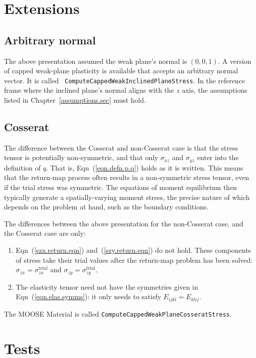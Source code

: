 \documentclass[]{scrreprt}
\begin{document}
\chapter{Extensions}

\section{Arbitrary normal}

The above presentation assumed the weak plane's normal is $(0, 0, 1)$.
A version of capped weak-plane plasticity is available that accepts an
arbitrary normal vector.  It is called {\tt
  ComputeCappedWeakInclinedPlaneStress}.  In the reference frame where
the inclined plane's normal aligns with the $z$ axis, the assumptions
listed in Chapter~\ref{assumptions.sec} must hold.

\section{Cosserat}
\label{cosserat.sec}

The difference between the Cosserat and non-Cosserat case is that the
stress tensor is potentially non-symmetric, and that only
$\sigma_{xz}$ and $\sigma_{yz}$ enter into the definition of $q$.
That is, Eqn~(\ref{eqn.defn.p.q}) holds as it is written.  This means
that the return-map process often results in a non-symmetric stress
tensor, even if the trial stress was symmetric.  The equations of
moment equilibrium then typically generate a spatially-varying moment
stress, the precise nature of which depends on the problem at hand,
such as the boundary conditions.

The differences between the above presentation for the non-Cosserat
case, and the Cosserat case are only:
\begin{enumerate}
\item Eqn~(\ref{szx.return.eqn}) and~(\ref{szy.return.eqn}) do not
  hold.  These components of stress take their trial values after the
  return-map problem has been solved: $\sigma_{zx} =
  \sigma_{zx}^{\mathrm{trial}}$ and $\sigma_{zy} =
  \sigma_{zy}^{\mathrm{trial}}$.
\item The elasticity tensor need not have the symmetries given in
  Eqn~(\ref{eqn.elas.symms}): it only needs to satisfy
  $E_{ijkl}=E_{klij}$.
\end{enumerate}
The MOOSE Material is called {\tt ComputeCappedWeakPlaneCosseratStress}.




\chapter{Tests}
\end{document}
